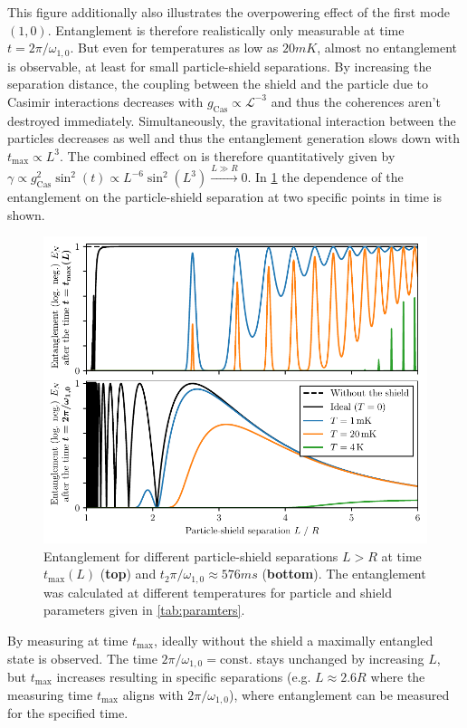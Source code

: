 This figure additionally also illustrates the overpowering effect of the first mode $(1,0)$.
Entanglement is therefore realistically only measurable at time $t = 2 \pi/\omega_{1,0}$.
But even for temperatures as low as $20\si{mK}$, almost no entanglement is observable, at least for small particle-shield separations.
By increasing the separation distance, the coupling between the shield and the particle due to Casimir interactions decreases with $g_\mathrm{Cas} \propto \mathscr{L}^{-3}$ and thus the coherences aren't destroyed immediately. 
Simultaneously, the gravitational interaction between the particles decreases as well and thus the entanglement generation slows down with $t_\mathrm{max} \propto L^{3}$.
The combined effect on is therefore quantitatively given by $\gamma \propto g_\mathrm{Cas}^2 \sin^2(t) \propto L^{-6} \sin^2(L^3) \xrightarrow{L \gg R} 0$.
In \cref{fig:5:entanglement-thermal-shield-L} the dependence of the entanglement on the particle-shield separation at two specific points in time is shown.
\begin{figure}[!htbp]
  \centering
  \includegraphics[width=\textwidth]{./../figures/vibrations/all-modes-entanglement-L.pdf}
  \caption{Entanglement for different particle-shield separations $L > R$ at time $t_\mathrm{max}(L)$ (\textbf{top}) and $t_2\pi/\omega_{1,0}\approx 576\si{ms}$ (\textbf{bottom}). The entanglement was calculated at different temperatures for particle and shield parameters given in \cref{tab:paramters}.}
  \label{fig:5:entanglement-thermal-shield-L}
\end{figure}
By measuring at time $t_\mathrm{max}$, ideally without the shield a maximally entangled state is observed. The time $2\pi/\omega_{1,0} = \mathrm{const.}$ stays unchanged by increasing $L$, but $t_\mathrm{max}$ increases resulting in specific separations (e.g. $L \approx 2.6R$ where the measuring time $t_\mathrm{max}$ aligns with $2\pi/\omega_{1,0}$), where entanglement can be measured for the specified time.
